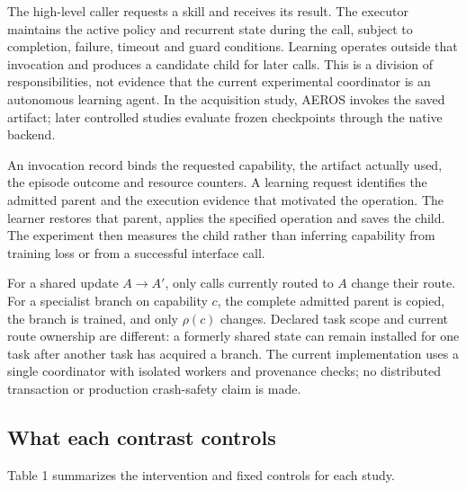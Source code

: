 \documentclass[10pt,letterpaper]{article}
\begin{document}
The high-level caller requests a skill and receives its result. The
executor maintains the active policy and recurrent state during the
call, subject to completion, failure, timeout and guard conditions.
Learning operates outside that invocation and produces a candidate child
for later calls. This is a division of responsibilities, not evidence
that the current experimental coordinator is an autonomous learning
agent. In the acquisition study, AEROS invokes the saved artifact; later
controlled studies evaluate frozen checkpoints through the native
backend.

An invocation record binds the requested capability, the artifact
actually used, the episode outcome and resource counters. A learning
request identifies the admitted parent and the execution evidence that
motivated the operation. The learner restores that parent, applies the
specified operation and saves the child. The experiment then measures
the child rather than inferring capability from training loss or from a
successful interface call.

For a shared update \(A\rightarrow A'\), only calls currently routed to
\(A\) change their route. For a specialist branch on capability \(c\),
the complete admitted parent is copied, the branch is trained, and only
\(\rho(c)\) changes. Declared task scope and current route ownership are
different: a formerly shared state can remain installed for one task
after another task has acquired a branch. The current implementation
uses a single coordinator with isolated workers and provenance checks;
no distributed transaction or production crash-safety claim is made.

\subsection{What each contrast
controls}\label{what-each-contrast-controls}

Table 1 summarizes the intervention and fixed controls for each study.
\end{document}
